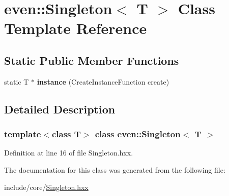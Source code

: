 \hypertarget{classeven_1_1_singleton}{}\section{even\+:\+:Singleton$<$ T $>$ Class Template Reference}
\label{classeven_1_1_singleton}
\subsection*{Static Public Member Functions}
\begin{DoxyCompactItemize}
\item 
\mbox{\label{classeven_1_1_singleton_a4fc234ec196ceea888a27e74f4547995}} 
static T $\ast$ {\bfseries instance} (Create\+Instance\+Function create)
\end{DoxyCompactItemize}


\subsection{Detailed Description}
\subsubsection*{template$<$class T$>$\newline
class even\+::\+Singleton$<$ T $>$}



Definition at line 16 of file Singleton.\+hxx.



The documentation for this class was generated from the following file\+:\begin{DoxyCompactItemize}
\item 
include/core/\mbox{\hyperlink{_singleton_8hxx}{Singleton.\+hxx}}\end{DoxyCompactItemize}

